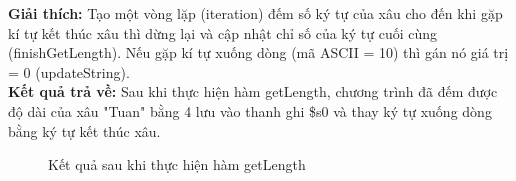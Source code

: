 \documentclass[a4paper,12pt]{article}
\begin{document}
\textbf{Giải thích:}
Tạo một vòng lặp (iteration) đếm số ký tự của xâu cho đến khi gặp kí tự kết thúc xâu thì dừng lại và cập nhật chỉ số của ký tự cuối cùng (finishGetLength). Nếu gặp kí tự xuống dòng (mã ASCII = 10) thì gán nó giá trị = 0 (updateString). \\
\textbf{Kết quả trả về:} Sau khi thực hiện hàm getLength, chương trình đã đếm được độ dài của xâu "Tuan" bằng 4 lưu vào thanh ghi \$s0 và thay ký tự xuống dòng bằng ký tự kết thúc xâu.
\begin{figure}[!h]
	\centerline{}
	\caption{Kết quả sau khi thực hiện hàm getLength}
	\label{fig:bai1}
\end{figure}
\clearpage
\end{document}
